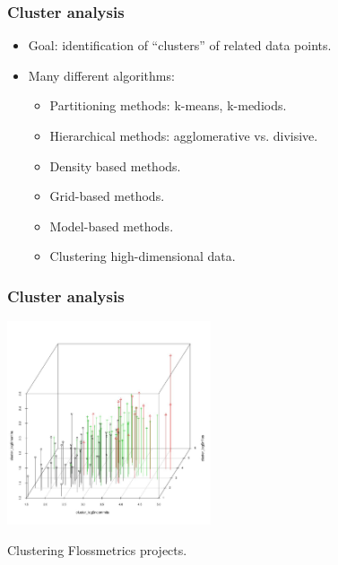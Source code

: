 \begin{frame}
\frametitle{Cluster analysis}

\begin{itemize}
 \item Goal: identification of ``clusters'' of related data points.
 \item Many different algorithms:
 \begin{itemize}
  \item Partitioning methods: k-means, k-mediods.
  \item Hierarchical methods: agglomerative vs. divisive.
  \item Density based methods.
  \item Grid-based methods.
  \item Model-based methods.
  \item Clustering high-dimensional data.
 \end{itemize}

\end{itemize}

\end{frame}


\begin{frame}
\frametitle{Cluster analysis}

\begin{center}
 \includegraphics[height=6cm]{figs/cluster3D.jpg}
\end{center}

\begin{flushright}
\small Clustering Flossmetrics projects.
\end{flushright}

\end{frame}


